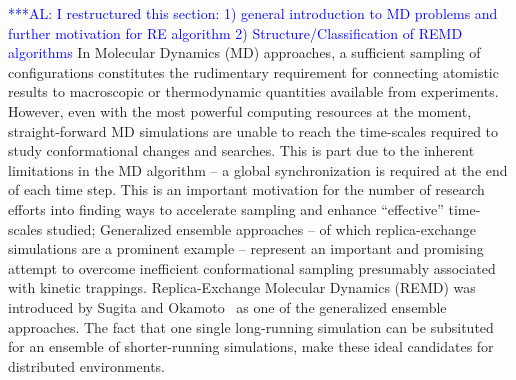 \documentclass[times, 10pt, twocolumn]{article}
\newcommand{\alnote}[1]{ {\textcolor{blue} { ***AL: #1 }}}
\newcommand{\jhanote}[1]{ {\textcolor{red} { ***SJ: #1 }}}
\newcommand{\alnote}[1]{}
\newcommand{\jhanote}[1]{}
\newcommand{\up}{\vspace*{-1em}}
\begin{document}


\alnote{I restructured this section: 1) general introduction to MD
  problems and further motivation for RE algorithm 2)
  Structure/Classification of REMD algorithms}
\up 
In Molecular Dynamics (MD) approaches, a sufficient sampling of
configurations constitutes the rudimentary requirement for connecting
atomistic results to macroscopic or thermodynamic quantities available
from experiments.  However, even with the most powerful computing
resources at the moment, straight-forward MD simulations are unable to
reach the time-scales required to study conformational changes and
searches. This is part due to the inherent limitations in the MD
algorithm -- a global synchronization is required at the end of each
time step.  This is an important motivation for the number of research
efforts into finding ways to accelerate sampling and enhance
``effective'' time-scales studied; Generalized ensemble approaches --
of which replica-exchange simulations are a prominent example --
represent an important and promising attempt to overcome inefficient
conformational sampling presumably associated with kinetic trappings.
Replica-Exchange Molecular Dynamics (REMD) was introduced by Sugita
and Okamoto~\cite{Sugita:1999rm} as one of the generalized ensemble
approaches. The fact that one single long-running simulation can be
subsituted for an ensemble of shorter-running simulations, make these
ideal candidates for distributed environments.

\end{document}
